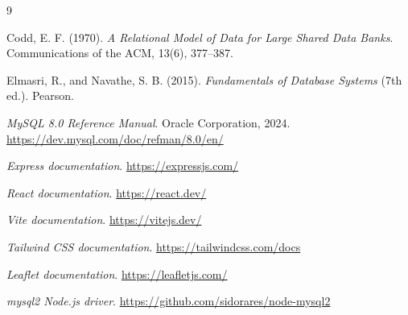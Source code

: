 \clearpage
\begin{thebibliography}{9}

Codd, E. F. (1970).
\textit{A Relational Model of Data for Large Shared Data Banks}.
Communications of the ACM, 13(6), 377--387.

Elmasri, R., and Navathe, S. B. (2015).
\textit{Fundamentals of Database Systems} (7th ed.). Pearson.

\textit{MySQL 8.0 Reference Manual}. Oracle Corporation, 2024.
\url{https://dev.mysql.com/doc/refman/8.0/en/}

\textit{Express documentation}.
\url{https://expressjs.com/}

\textit{React documentation}.
\url{https://react.dev/}

\textit{Vite documentation}.
\url{https://vitejs.dev/}

\textit{Tailwind CSS documentation}.
\url{https://tailwindcss.com/docs}

\textit{Leaflet documentation}.
\url{https://leafletjs.com/}

\textit{mysql2 Node.js driver}.
\url{https://github.com/sidorares/node-mysql2}

\end{thebibliography}
